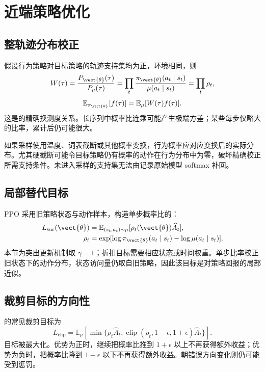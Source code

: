 \documentclass[../textbook.tex]{subfiles}
\begin{document}
\section{近端策略优化}

\subsection{整轨迹分布校正}
假设行为策略对目标策略的轨迹支持集均为正，环境相同，则
\begin{equation}
 W(\tau)=\frac{P_{\vect{\theta}}(\tau)}{P_\mu(\tau)}
 =\prod_t\frac{\pi_{\vect{\theta}}(a_t\mid s_t)}{\mu(a_t\mid s_t)}
 =\prod_t\rho_t,
\end{equation}
\begin{equation}
 \mathbb E_{\pi_{\vect{\theta}}}[f(\tau)]=\mathbb E_\mu[W(\tau)f(\tau)].
 \label{eq:rl-importance}
\end{equation}
这是的精确换测度关系。长序列中概率比连乘可能产生极端方差；某些每步仅略大的比率，累计后仍可能很大。

如果采样使用温度、词表截断或其他概率变换，行为概率应对应变换后的实际分布。尤其硬截断可能令目标策略仍有概率的动作在行为分布中为零，破坏精确校正所需支持条件。未进入采样的支持集无法由记录原始模型 softmax 补回。

\subsection{局部替代目标}
PPO 采用旧策略状态与动作样本，构造单步概率比的\cite{schulman2017ppo}：
\begin{equation}
\begin{aligned}
 L_{\mathrm{sur}}(\vect{\theta}) &= \mathbb E_{(s_t,a_t)\sim\mu} [\rho_t(\vect{\theta})\widehat A_t], \\
 \rho_t &= \exp[\log\pi_{\vect{\theta}}(a_t\mid s_t)-\log\mu(a_t\mid s_t)].
\end{aligned}
\end{equation}
本节为突出更新机制取 $\gamma=1$；折扣目标需要相应状态或时间权重。单步比率校正旧状态下的动作分布，状态访问量仍取自旧策略，因此该目标是对策略回报的局部近似。

\subsection{裁剪目标的方向性}
的常见裁剪目标为
\begin{equation}
 L_{\mathrm{clip}}=\mathbb E_\mu\left[
 \min\{\rho_t\widehat A_t,
 \operatorname{clip}(\rho_t,1-\epsilon,1+\epsilon)\widehat A_t\}\right].
 \label{eq:rl-ppo}
\end{equation}
目标被最大化。优势为正时，继续把概率比推到 $1+\epsilon$ 以上不再获得额外收益；优势为负时，把概率比降到 $1-\epsilon$ 以下不再获得额外收益。朝错误方向变化则仍可能受到惩罚。
\end{document}
